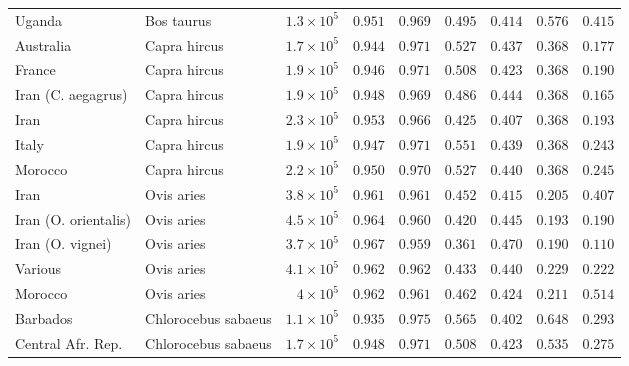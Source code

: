 \documentclass[9pt,twocolumn,twoside,lineno]{pnas-new}
\begin{document}
\begin{table}[tb]
\begin{adjustbox}{width=17.8cm}
\begin{tabular}{||l|l|r||r|r||r|r||r|r||}
                     Uganda & Bos taurus & $1.3\times 10^{5}$ & $ 0.951$ & $ 0.969$ & $ 0.495$ & $ 0.414$ & $ 0.576$ & $ 0.415$ \\
                     \rowcolor{LIGHTGREY} Australia & Capra hircus & $1.7\times 10^{5}$ & $ 0.944$ & $ 0.971$ & $ 0.527$ & $ 0.437$ & $ 0.368$ & $ 0.177$ \\
                     \rowcolor{LIGHTGREY} France & Capra hircus & $1.9\times 10^{5}$ & $ 0.946$ & $ 0.971$ & $ 0.508$ & $ 0.423$ & $ 0.368$ & $ 0.190$ \\
                     \rowcolor{LIGHTGREY} Iran (C. aegagrus) & Capra hircus & $1.9\times 10^{5}$ & $ 0.948$ & $ 0.969$ & $ 0.486$ & $ 0.444$ & $ 0.368$ & $ 0.165$ \\
                     \rowcolor{LIGHTGREY} Iran & Capra hircus & $2.3\times 10^{5}$ & $ 0.953$ & $ 0.966$ & $ 0.425$ & $ 0.407$ & $ 0.368$ & $ 0.193$ \\
                     \rowcolor{LIGHTGREY} Italy & Capra hircus & $1.9\times 10^{5}$ & $ 0.947$ & $ 0.971$ & $ 0.551$ & $ 0.439$ & $ 0.368$ & $ 0.243$ \\
                     \rowcolor{LIGHTGREY} Morocco & Capra hircus & $2.2\times 10^{5}$ & $ 0.950$ & $ 0.970$ & $ 0.527$ & $ 0.440$ & $ 0.368$ & $ 0.245$ \\
                     Iran & Ovis aries & $3.8\times 10^{5}$ & $ 0.961$ & $ 0.961$ & $ 0.452$ & $ 0.415$ & $ 0.205$ & $ 0.407$ \\
                     Iran (O. orientalis) & Ovis aries & $4.5\times 10^{5}$ & $ 0.964$ & $ 0.960$ & $ 0.420$ & $ 0.445$ & $ 0.193$ & $ 0.190$ \\
                     Iran (O. vignei) & Ovis aries & $3.7\times 10^{5}$ & $ 0.967$ & $ 0.959$ & $ 0.361$ & $ 0.470$ & $ 0.190$ & $ 0.110$ \\
                     Various & Ovis aries & $4.1\times 10^{5}$ & $ 0.962$ & $ 0.962$ & $ 0.433$ & $ 0.440$ & $ 0.229$ & $ 0.222$ \\
                     Morocco & Ovis aries & $ 4\times 10^{5}$ & $ 0.962$ & $ 0.961$ & $ 0.462$ & $ 0.424$ & $ 0.211$ & $ 0.514$ \\
                     \rowcolor{LIGHTGREY} Barbados & Chlorocebus sabaeus & $1.1\times 10^{5}$ & $ 0.935$ & $ 0.975$ & $ 0.565$ & $ 0.402$ & $ 0.648$ & $ 0.293$ \\
                     \rowcolor{LIGHTGREY} Central Afr. Rep. & Chlorocebus sabaeus & $1.7\times 10^{5}$ & $ 0.948$ & $ 0.971$ & $ 0.508$ & $ 0.423$ & $ 0.535$ & $ 0.275$ \\

\end{tabular}
\end{adjustbox}
\end{table}
\end{document}
